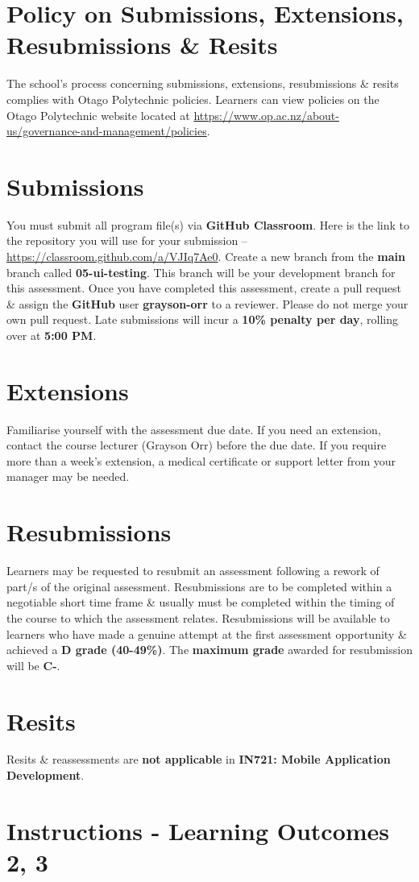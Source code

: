 \documentclass{article}
\begin{document}
\section*{Policy on Submissions, Extensions, Resubmissions \& Resits}
The school's process concerning submissions, extensions, resubmissions \& resits complies with Otago Polytechnic policies. Learners can view policies on the Otago Polytechnic website located at \href{https://www.op.ac.nz/about-us/governance-and-management/policies}{https://www.op.ac.nz/about-us/governance-and-management/policies}.

\section*{Submissions}
You must submit all program file(s) via \textbf{GitHub Classroom}. Here is the link to the repository you will use for your submission – \href{https://classroom.github.com/a/VJIq7Ae0}{https://classroom.github.com/a/VJIq7Ae0}. Create a new branch from the \textbf{main} branch called \textbf{05-ui-testing}. This branch will be your development branch for this assessment. Once you have completed this assessment, create a pull request \& assign the \textbf{GitHub} user \textbf{grayson-orr} to a reviewer. Please do not merge your own pull request. Late submissions will incur a \textbf{10\% penalty per day}, rolling over at \textbf{5:00 PM}.

\section*{Extensions}
Familiarise yourself with the assessment due date. If you need an extension, contact the course lecturer (Grayson Orr) before the due date. If you require more than a week's extension, a medical certificate or support letter from your manager may be needed.

\section*{Resubmissions}
Learners may be requested to resubmit an assessment following a rework of part/s of the original assessment. Resubmissions are to be completed within a negotiable short time frame \& usually must be completed within the timing of the course to which the assessment relates. Resubmissions will be available to learners who have made a genuine attempt at the first assessment opportunity \& achieved a \textbf{D grade (40-49\%)}. The \textbf{maximum grade} awarded for resubmission will be \textbf{C-}.

\section*{Resits}
Resits \& reassessments are \textbf{not applicable} in \textbf{IN721: Mobile Application Development}.

\section*{Instructions - Learning Outcomes 2, 3}
 
\end{document}

